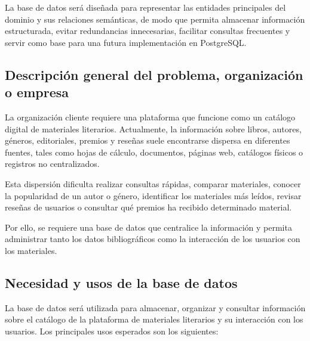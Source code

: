 \documentclass[12pt,a4paper]{article}
\begin{document}
La base de datos será diseñada para representar las entidades principales del dominio y sus relaciones semánticas, de modo que permita almacenar información estructurada, evitar redundancias innecesarias, facilitar consultas frecuentes y servir como base para una futura implementación en PostgreSQL.

\subsection{Descripción general del problema, organización o empresa}

La organización cliente requiere una plataforma que funcione como un catálogo digital de materiales literarios. Actualmente, la información sobre libros, autores, géneros, editoriales, premios y reseñas suele encontrarse dispersa en diferentes fuentes, tales como hojas de cálculo, documentos, páginas web, catálogos físicos o registros no centralizados.

Esta dispersión dificulta realizar consultas rápidas, comparar materiales, conocer la popularidad de un autor o género, identificar los materiales más leídos, revisar reseñas de usuarios o consultar qué premios ha recibido determinado material.

Por ello, se requiere una base de datos que centralice la información y permita administrar tanto los datos bibliográficos como la interacción de los usuarios con los materiales.

\subsection{Necesidad y usos de la base de datos}



La base de datos será utilizada para almacenar, organizar y consultar información sobre el catálogo de la plataforma de materiales literarios y su interacción con los usuarios. Los principales usos esperados son los siguientes:
\end{document}
